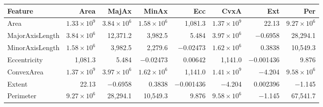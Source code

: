 \begin{tabular}{lrrrrrrr}
\toprule
Feature & Area & MajAx & MinAx & Ecc & CvxA & Ext & Per \\
\midrule
Area & $1.33\times10^{9}$ & $3.84\times10^{6}$ & $1.58\times10^{6}$ & 1,081.3 & $1.37\times10^{9}$ & 22.13 & $9.27\times10^{6}$ \\
MajorAxisLength & $3.84\times10^{6}$ & 12,371.2 & 3,982.5 & 5.484 & $3.97\times10^{6}$ & $-$0.6958 & 28,294.1 \\
MinorAxisLength & $1.58\times10^{6}$ & 3,982.5 & 2,279.6 & $-$0.02473 & $1.62\times10^{6}$ & 0.3838 & 10,549.3 \\
Eccentricity & 1,081.3 & 5.484 & $-$0.02473 & 0.00642 & 1,141.0 & $-$0.001436 & 9.876 \\
ConvexArea & $1.37\times10^{9}$ & $3.97\times10^{6}$ & $1.62\times10^{6}$ & 1,141.0 & $1.41\times10^{9}$ & $-$4.204 & $9.58\times10^{6}$ \\
Extent & 22.13 & $-$0.6958 & 0.3838 & $-$0.001436 & $-$4.204 & 0.002396 & $-$1.145 \\
Perimeter & $9.27\times10^{6}$ & 28,294.1 & 10,549.3 & 9.876 & $9.58\times10^{6}$ & $-$1.145 & 67,541.7 \\
\bottomrule
\end{tabular}
